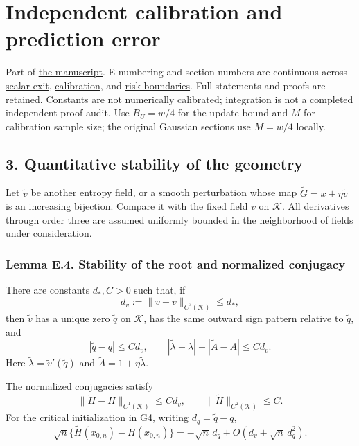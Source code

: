 \section{Independent calibration and prediction
error}\label{calibration-independent-calibration-and-prediction-error}

Part of \href{DRAFT.md}{the manuscript}. E-numbering and section numbers
are continuous across \href{scalar_exit.md}{scalar exit},
\href{calibration.md}{calibration}, and \href{risk_boundaries.md}{risk
boundaries}. Full statements and proofs are retained. Constants are not
numerically calibrated; integration is not a completed independent proof
audit. Use \(B_U=w/4\) for the update bound and \(M\) for calibration
sample size; the original Gaussian sections use \(M=w/4\) locally.

\subsection{3. Quantitative stability of the
geometry}\label{calibration-quantitative-stability-of-the-geometry}

Let \(\widetilde v\) be another entropy field, or a smooth perturbation
whose map \(\widetilde G=x+\eta\widetilde v\) is an increasing
bijection. Compare it with the fixed field \(v\) on \(\mathcal K\). All
derivatives through order three are assumed uniformly bounded in the
neighborhood of fields under consideration.

\subsubsection{Lemma E.4. Stability of the root and normalized
conjugacy}\label{calibration-lemma-e.4.-stability-of-the-root-and-normalized-conjugacy}

There are constants \(d_*,C>0\) such that, if \[
d_v:=\|\widetilde v-v\|_{C^3(\mathcal K)}\le d_*,
\tag{E.33}
\] then \(\widetilde v\) has a unique zero \(\widetilde q\) on
\(\mathcal K\), has the same outward sign pattern relative to
\(\widetilde q\), and \[
|\widetilde q-q|\le C d_v,\qquad
|\widetilde\lambda-\lambda|+|\widetilde A-A|\le C d_v.
\tag{E.34}
\] Here \(\widetilde\lambda=\widetilde v'(\widetilde q)\) and
\(\widetilde A=1+\eta\widetilde\lambda\).

The normalized conjugacies satisfy \[
\|\widetilde H-H\|_{C^1(\mathcal K)}\le C d_v,
\qquad
\|\widetilde H\|_{C^2(\mathcal K)}\le C.
\tag{E.35}
\] For the critical initialization in G4, writing
\(d_q=\widetilde q-q\), \[
\sqrt n\{\widetilde H(x_{0,n})-H(x_{0,n})\}
=-\sqrt n\,d_q+
O\!\left(d_v+\sqrt n\,d_q^2\right).
\tag{E.36}
\]

